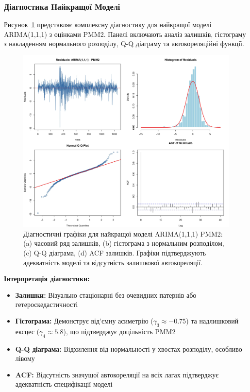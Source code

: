 \documentclass[12pt,a4paper]{article}
\begin{document}
\subsubsection{Діагностика Найкращої Моделі}

Рисунок~\ref{fig:best_model_diagnostics} представляє комплексну діагностику для найкращої моделі ARIMA(1,1,1) з оцінками PMM2. Панелі включають аналіз залишків, гістограму з накладенням нормального розподілу, Q-Q діаграму та автокореляційні функції.

\begin{figure}[htbp]
\centering
\includegraphics[width=\textwidth]{figures/09_best_model_diagnostics.pdf}
\caption{Діагностичні графіки для найкращої моделі ARIMA(1,1,1) PMM2: (a) часовий ряд залишків, (b) гістограма з нормальним розподілом, (c) Q-Q діаграма, (d) ACF залишків. Графіки підтверджують адекватність моделі та відсутність залишкової автокореляції.}
\label{fig:best_model_diagnostics}
\end{figure}

\textbf{Інтерпретація діагностики:}
\begin{itemize}
    \item \textbf{Залишки:} Візуально стаціонарні без очевидних патернів або гетероскедастичності
    \item \textbf{Гістограма:} Демонструє від'ємну асиметрію ($\gamma_3 \approx -0.75$) та надлишковий ексцес ($\gamma_4 \approx 5.8$), що підтверджує доцільність PMM2
    \item \textbf{Q-Q діаграма:} Відхилення від нормальності у хвостах розподілу, особливо лівому
    \item \textbf{ACF:} Відсутність значущої автокореляції на всіх лагах підтверджує адекватність специфікації моделі
\end{itemize}
\end{document}
